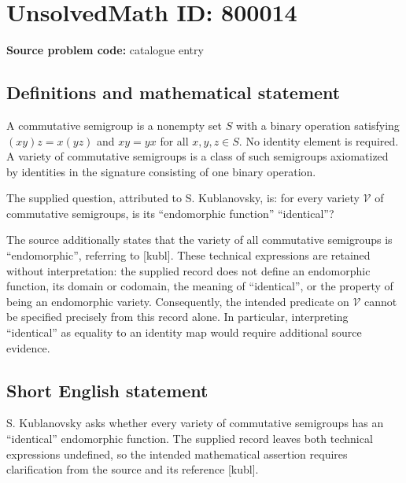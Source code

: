 \documentclass[11pt]{article}
\begin{document}
\section*{UnsolvedMath ID: 800014}
\textbf{Source problem code:} catalogue entry
\subsection{Definitions and mathematical statement}
A commutative semigroup is a nonempty set \(S\) with a binary operation satisfying \((xy)z=x(yz)\) and \(xy=yx\) for all \(x,y,z\in S\). No identity element is required. A variety of commutative semigroups is a class of such semigroups axiomatized by identities in the signature consisting of one binary operation.

The supplied question, attributed to S. Kublanovsky, is: for every variety \(\mathcal V\) of commutative semigroups, is its ``endomorphic function'' ``identical''?

The source additionally states that the variety of all commutative semigroups is ``endomorphic'', referring to [kubl]. These technical expressions are retained without interpretation: the supplied record does not define an endomorphic function, its domain or codomain, the meaning of ``identical'', or the property of being an endomorphic variety. Consequently, the intended predicate on \(\mathcal V\) cannot be specified precisely from this record alone. In particular, interpreting ``identical'' as equality to an identity map would require additional source evidence.
\subsection{Short English statement}
S. Kublanovsky asks whether every variety of commutative semigroups has an ``identical'' endomorphic function. The supplied record leaves both technical expressions undefined, so the intended mathematical assertion requires clarification from the source and its reference [kubl].
\end{document}
